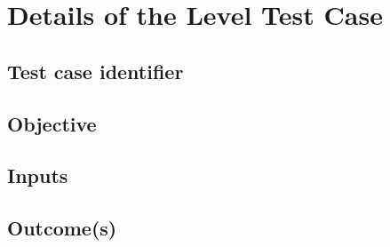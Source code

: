 \chapter{Details of the Level Test Case} \label{chp:}
	\begin{comment}
		Introduce the following subordinate sections. Describe each test case and its unique identifier,
		objectives, outcomes, environmental needs, and special procedures.
	\end{comment}

\section{Test case identifier} \label{s::test-cast-identifier}
	\begin{comment}
		Describe the unique identifier needed by each test case so that it can be distinguished from all other
		test cases. An automated tool may control the generation of the identifiers.
	\end{comment}

\section{Objective}  \label{s::objective}
	\begin{comment}
		Identify and briefly describe the special focus or objective for the test case or a series of test cases.
		This is much more detailed than the Test Items in the Level Test Plan. It may include the risk or
		priority for this particular test case or series of test cases.
	\end{comment}
	
\section{Inputs}  \label{s::inputs}
	\begin{comment}	
		Specify each input required to execute each test case. Some inputs will be specified by value (with
		tolerances where appropriate), whereas others, such as constant tables or transaction files, will be
		specified by name. Identify all appropriate databases, files, terminal messages, memory resident areas,
		and values passed by the operating system.
		Specify all required relationships between inputs (e.g., timing).
	\end{comment}

\section{Outcome(s)}  \label{s::outcome}
	\begin{comment}
		Specify all outputs and the expected behavior (e.g., response time) required of the test items. Provide
		the exact value(s) (with tolerances where appropriate) for each required output and expected behavior.
		This section is not required for self-validating tests.
	\end{comment}

